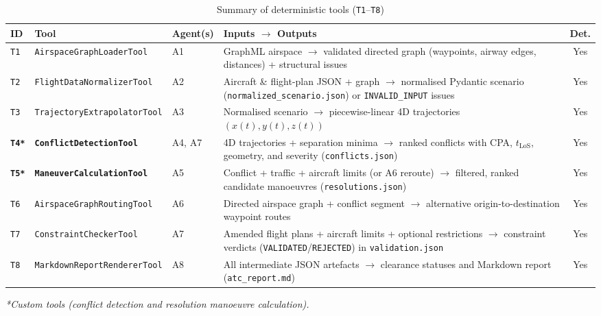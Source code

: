 \begin{table}[H]
\centering
\caption{Summary of deterministic tools (\texttt{T1}--\texttt{T8})}
\label{tab:tools}
\footnotesize
\setlength{\tabcolsep}{4pt}
\begin{tabularx}{\linewidth}{@{}l l l >{\raggedright\arraybackslash}X c@{}}
\toprule
\textbf{ID} & \textbf{Tool} & \textbf{Agent(s)} & \textbf{Inputs $\rightarrow$ Outputs} & \textbf{Det.} \\
\midrule
\texttt{T1} & \texttt{AirspaceGraphLoaderTool} & A1 &
GraphML airspace $\rightarrow$ validated directed graph (waypoints, airway edges, distances) + structural issues & Yes \\
\texttt{T2} & \texttt{FlightDataNormalizerTool} & A2 &
Aircraft \& flight-plan JSON + graph $\rightarrow$ normalised Pydantic scenario (\texttt{normalized\_scenario.json}) or \texttt{INVALID\_INPUT} issues & Yes \\
\texttt{T3} & \texttt{TrajectoryExtrapolatorTool} & A3 &
Normalised scenario $\rightarrow$ piecewise-linear 4D trajectories $(x(t),y(t),z(t))$ & Yes \\
\textbf{\texttt{T4*}} & \textbf{\texttt{ConflictDetectionTool}} & A4, A7 &
4D trajectories + separation minima $\rightarrow$ ranked conflicts with CPA, $t_{\text{LoS}}$, geometry, and severity (\texttt{conflicts.json}) & Yes \\
\textbf{\texttt{T5*}} & \textbf{\texttt{ManeuverCalculationTool}} & A5 &
Conflict + traffic + aircraft limits (or A6 reroute) $\rightarrow$ filtered, ranked candidate manoeuvres (\texttt{resolutions.json}) & Yes \\
\texttt{T6} & \texttt{AirspaceGraphRoutingTool} & A6 &
Directed airspace graph + conflict segment $\rightarrow$ alternative origin-to-destination waypoint routes & Yes \\
\texttt{T7} & \texttt{ConstraintCheckerTool} & A7 &
Amended flight plans + aircraft limits + optional restrictions $\rightarrow$ constraint verdicts (\texttt{VALIDATED}/\texttt{REJECTED}) in \texttt{validation.json} & Yes \\
\texttt{T8} & \texttt{MarkdownReportRendererTool} & A8 &
All intermediate JSON artefacts $\rightarrow$ clearance statuses and Markdown report (\texttt{atc\_report.md}) & Yes \\
\bottomrule
\end{tabularx}
\par\vspace{2pt}
\raggedright\scriptsize\textit{*Custom tools (conflict detection and resolution manoeuvre calculation).}
\end{table}

